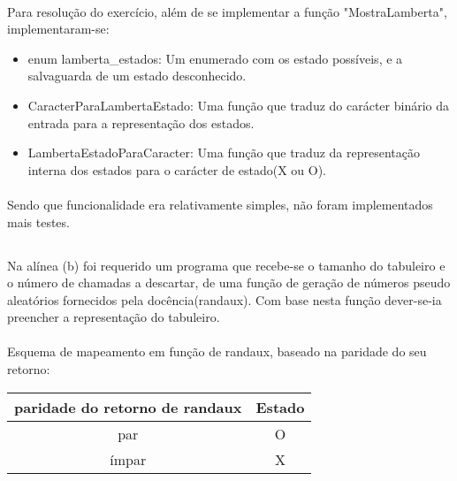 \paragraph{} Para resolução do exercício, além de se implementar a função
"MostraLamberta", implementaram-se:

\begin{itemize}
	\item enum lamberta\_estados: Um enumerado com os estado possíveis, e a
		salvaguarda de um estado desconhecido.
	\item CaracterParaLambertaEstado: Uma função que traduz do carácter
		binário da entrada para a representação dos estados.
	\item LambertaEstadoParaCaracter: Uma função que traduz da representação
		interna dos estados para o carácter de estado(X ou O).
\end{itemize}

\paragraph{}Sendo que funcionalidade era relativamente simples, não foram
implementados mais testes.

\newpage

\subsection{}

\paragraph{} Na alínea (b) foi requerido um programa que recebe-se o tamanho
do tabuleiro e o número de chamadas a descartar, de uma função de geração de
números pseudo aleatórios fornecidos pela docência(randaux). Com base nesta
função dever-se-ia preencher a representação do tabuleiro.

\paragraph{} Esquema de mapeamento em função de randaux, baseado na paridade
do seu retorno:


\begin{center}
\begin{tabular}{c|c}
	paridade do retorno de randaux & Estado \\
	\hline
	par & O \\
	ímpar & X \\
\end{tabular}
\end{center}

